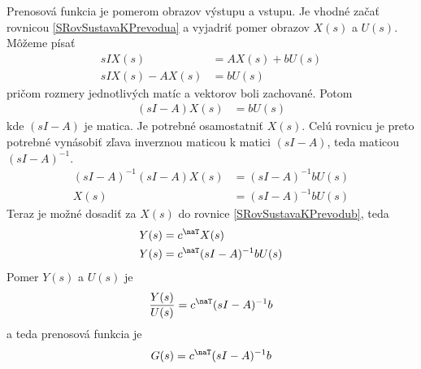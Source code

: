 \documentclass[a4paper, 10pt, ]{article}
\begin{document}
Prenosová funkcia je pomerom obrazov výstupu a vstupu. Je vhodné začať rovnicou \eqref{SRovSustavaKPrevodua} a vyjadriť pomer obrazov $X(s)$ a $U(s)$. Môžeme písať
\begin{align}
    s I X(s) &= A X(s) + b U(s) \\
    s I X(s) - A X(s) &= b U(s)
\end{align}
pričom rozmery jednotlivých matíc a vektorov boli zachované. Potom
\begin{align}
    (s I - A) X(s) &= b U(s)
\end{align}
kde $(s I - A)$ je matica. Je potrebné osamostatniť $X(s)$. Celú rovnicu je preto potrebné vynásobiť zľava inverznou maticou k matici $(s I - A)$, teda maticou $(s I - A)^{-1}$.
\begin{align}
    (s I - A)^{-1} (s I - A) X(s) &= (s I - A)^{-1} b U(s) \\
    X(s) &= (s I - A)^{-1} b U(s)
\end{align}
Teraz je možné dosadiť za $X(s)$ do rovnice \eqref{SRovSustavaKPrevodub}, teda
\begin{align}
    Y(s) &= c^\naT X(s) \\
    Y(s) &= c^\naT (s I - A)^{-1} b U(s)
\end{align}
Pomer $Y(s)$ a $U(s)$ je
\begin{align}
    \frac{Y(s)}{U(s)} = c^\naT (s I - A)^{-1} b
\end{align}
a teda prenosová funkcia je
\begin{align}
    G(s) = c^\naT (s I - A)^{-1} b
\end{align}
\end{document}
